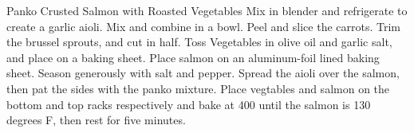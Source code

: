 \documentclass[]{article}
\title{}
\author{}
\begin{document}
\begin{recipe}{Panko Crusted Salmon with Roasted Vegetables}{}{}
	Mix in blender and refrigerate to create a garlic aioli.
	Mix and combine in a bowl. 
	Peel and slice the carrots.
	Trim the brussel sprouts, and cut in half. Toss Vegetables in olive oil and garlic salt, and place on a baking sheet.
	Place salmon on an aluminum-foil lined baking sheet. Season generously with salt and pepper. Spread the aioli over the salmon, then pat the sides with the panko mixture.
	\ingredient[]{}{}
	Place vegtables and salmon on the bottom and top racks respectively and bake at 400 until the salmon is 130 degrees F, then rest for five minutes. 
\end{recipe}
\end{document}
